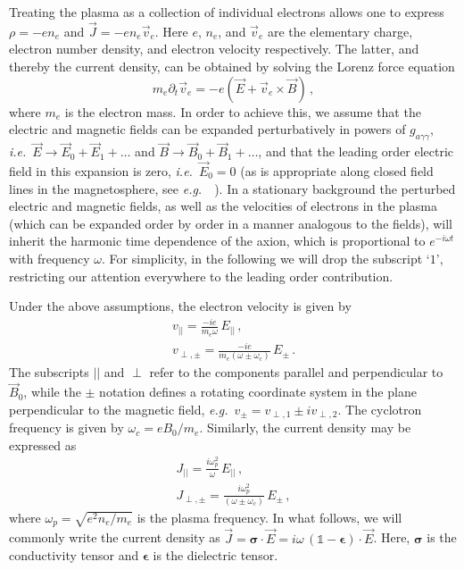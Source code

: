 \documentclass[twocolumn,superscriptaddress,floatfix,preprintnumbers,prd,nofootinbib,aps,10pt]{revtex4-2}
\renewcommand\({\left(}
\renewcommand\){\right)}
\renewcommand\[{\left[}
\renewcommand\]{\right]}
\newcommand\ie{{\it i.e.}~}
\newcommand\eg{{\it e.g.}~}
\begin{document}
Treating the plasma as a collection of individual electrons allows one to express $\rho = -e n_e$ and  $\vec{J} = -e n_e \vec{v}_e$. Here $e$, $n_e$, and $\vec{v}_e$ are the elementary charge, electron number density, and electron velocity respectively. The latter, and thereby the current density, can be obtained by solving the Lorenz force equation
%
\begin{equation}\label{eq:lorenz}
    m_e \partial_t \vec{v}_e = -e (\vec{E} + \vec{v}_e \times \vec{B}) \, ,
\end{equation} 
%
where $m_e$ is the electron mass. In order to achieve this, we assume that the electric and magnetic fields can be expanded perturbatively in powers of $g_{a\gamma\gamma}$, \ie $\vec{E} \rightarrow \vec{E}_0 + \vec{E}_1 + \dots$ and $\vec{B} \rightarrow \vec{B}_0 + \vec{B}_1 + \dots$, and that the leading order electric field in this expansion is zero, \ie $\vec{E}_0 = 0$ (as is appropriate along closed field lines in the magnetosphere, see \eg~\cite{Goldreich:1969sb,Sturrock1971a}). In a stationary background the perturbed electric and magnetic fields, as well as the velocities of electrons in the plasma (which can be expanded order by order in a manner analogous to the fields), will inherit the harmonic time dependence of the axion, which is proportional to $e^{- i \omega t}$ with frequency $\omega$. For simplicity, in the following we will drop the subscript `$1$', restricting our attention everywhere to the leading order contribution. 

Under the above assumptions, the electron velocity is given by~\cite{swanson2003plasma}
%
\begin{gather}
    v_{||} = \frac{-i e}{m_e \omega} \, E_{||} \, , \label{eq:vel1} \\
    v_{\perp, \pm} =  \frac{-i e}{m_e (\omega \pm \omega_c)} \, E_{\pm} \, . \label{eq:vel2}
\end{gather}
%
The subscripts ${||}$ and ${\perp}$ refer to the components parallel and perpendicular to $\vec{B}_0$, while the $\pm$ notation defines a rotating coordinate system in the plane perpendicular to the magnetic field, \eg $v_{\pm} = v_{\perp, 1} \pm i v_{\perp, 2}$. The cyclotron frequency is given by $\omega_c = e B_0 / m_e$. Similarly, the current density may be expressed as~\cite{swanson2003plasma}
%
\begin{gather}
    J_{{||}} = \frac{i \omega_p^2}{\omega} \, E_{{||}} \, , \\
    J_{\perp, \pm} = \frac{i \omega_p^2}{(\omega \pm \omega_c)} \, E_{\pm} \, ,
\end{gather}
%
where $\omega_p = \sqrt{e^2 n_e / m_e}$ is the plasma frequency. In what follows, we will commonly write the current density as $\vec{J} = \boldsymbol\sigma \cdot \vec{E} = i\omega \, (\mathbb{1} - \boldsymbol\epsilon) \cdot \vec{E}$. Here, $\boldsymbol{\sigma}$ is the conductivity tensor and $\boldsymbol\epsilon$ is the dielectric tensor.
\end{document}
